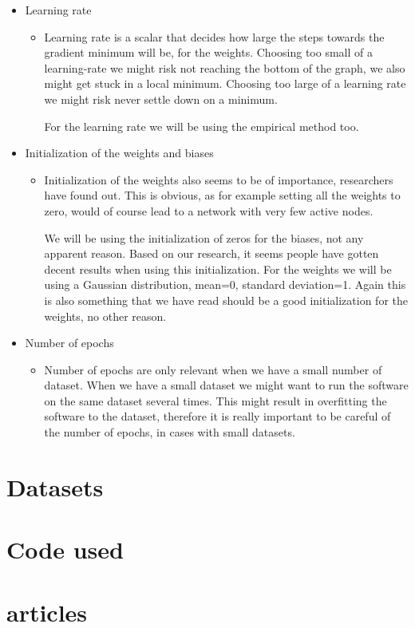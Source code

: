 \documentclass[Report.tex]{subfiles}
\begin{document}
\begin{flushleft}
\begin{itemize}
\begin{itemize}
     \end{itemize}
     \item{Learning rate}
     \begin{itemize}
      \item{Learning rate is a scalar that decides how large the steps towards the gradient minimum will be, for the weights. Choosing too small of a learning-rate we might risk not reaching the bottom of the graph, we also might get stuck in a local minimum. Choosing too large of a learning rate we might risk never settle down on a minimum. \par
      For the learning rate we will be using the empirical method too.}
     \end{itemize}
     \item{Initialization of the weights and biases}
     \begin{itemize}
      \item{Initialization of the weights also seems to be of importance, researchers have found out. This is obvious, as for example setting all the weights to zero, would of course lead to a network with very few active nodes. \par
      We will be using the initialization of zeros for the biases, not any apparent reason. Based on our research, it seems people have gotten decent results when using this initialization. For the weights we will be using a Gaussian distribution, mean=0, standard deviation=1. Again this is also something that we have read should be a good initialization for the weights, no other reason.}
     \end{itemize}
     \item{Number of epochs}
     \begin{itemize}
      \item{Number of epochs are only relevant when we have a small number of dataset. When we have a small dataset we might want to run the software on the same dataset several times. This might result in overfitting the software to the dataset, therefore it is really important to be careful of the number of epochs, in cases with small datasets.}
     \end{itemize}
    \end{itemize}
  \end{flushleft}


\section{Datasets}
\section{Code used}
\section{articles}

\end{document}
